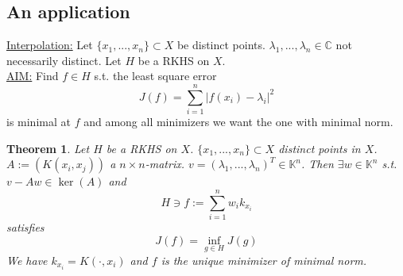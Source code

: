 \documentclass[a4paper, 12pt]{article}
\theoremstyle{plain}
\newtheorem{theorem}{Theorem}[subsection] %
\theoremstyle{definition}
\theoremstyle{lemma}
\theoremstyle{remark}
\theoremstyle{corollary}
\theoremstyle{example}
\begin{document}
	\subsection{An application}
	\underline{Interpolation:} Let $\{x_1,...,x_n\} \subset X$ be distinct points. $\lambda_1,...,\lambda_n \in \mathbb{C}$ not necessarily distinct. Let $H$ be a RKHS on $X$.\\
	\underline{AIM:} Find $f \in H$ s.t. the least square error \[J(f) = \sum_{i=1}^n \left|f(x_i) - \lambda_i\right|^2\] is minimal at $f$ and among all minimizers we want the one with minimal norm. 
	\begin{theorem}
		Let $H$ be a RKHS on $X$. $\{x_1,...,x_n\} \subset X$ distinct points in $X$. $A:= (K(x_i,x_j))$ a $n\times n$-matrix. $v = (\lambda_1,...,\lambda_n)^T \in \mathbb{K}^n$. Then $\exists w \in \mathbb{K}^n$ s.t. $v-Aw \in \ker(A)$ and \[H \ni f:= \sum_{i=1}^n w_ik_{x_i}\] satisfies \[J(f) = \inf_{g \in H} J(g)\] We have $k_{x_i} = K(\cdot,x_i)$ and $f$ is the unique minimizer of minimal norm. 
	\end{theorem}
\end{document}
